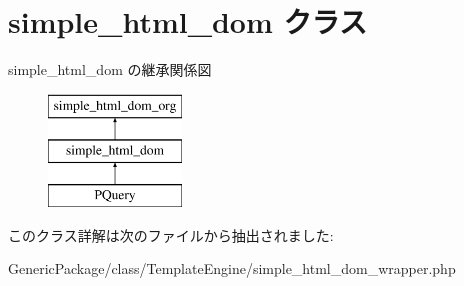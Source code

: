 \hypertarget{classsimple__html__dom}{}\section{simple\+\_\+html\+\_\+dom クラス}
\label{classsimple__html__dom}
simple\+\_\+html\+\_\+dom の継承関係図\begin{figure}[H]
\begin{center}
\leavevmode
\includegraphics[height=3.000000cm]{classsimple__html__dom}
\end{center}
\end{figure}


このクラス詳解は次のファイルから抽出されました\+:\begin{DoxyCompactItemize}
\item 
Generic\+Package/class/\+Template\+Engine/simple\+\_\+html\+\_\+dom\+\_\+wrapper.\+php\end{DoxyCompactItemize}
